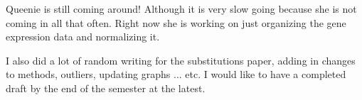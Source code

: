 \documentclass[12pt]{article}
\newcommand{\strep}{\textit{Streptomyces}\xspace}
\newcommand{\ecoli}{\textit{Escherichia coli}\xspace}
\begin{document}
Queenie is still coming around! Although it is very slow going because she is not coming in all that often. Right now she is working on just organizing the gene expression data and normalizing it.

I also did a lot of random writing for the substitutions paper, adding in changes to methods, outliers, updating graphs ... etc.
I would like to have a completed draft by the end of the semester at the latest.

%
%
%





\end{document}
